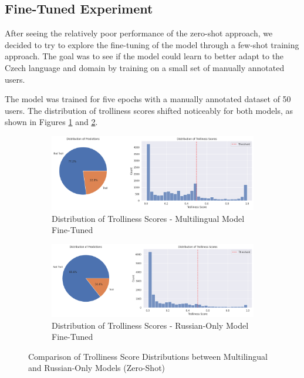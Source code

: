 \documentclass[twoside]{ctuthesis}
\theoremstyle{plain}
\theoremstyle{definition}
\theoremstyle{note}
\begin{document}
\subsection{Fine-Tuned Experiment}
After seeing the relatively poor performance of the zero-shot approach, we decided to try to explore the fine-tuning of the model through a few-shot training approach. The goal was to see if the model could learn to better adapt to the Czech language and domain by training on a small set of manually annotated users.\par
The model was trained for five epochs with a manually annotated dataset of 50 users. The distribution of trolliness scores shifted noticeably for both models, as shown in Figures \ref{fig:distribution_multi_finetuned} and \ref{fig:russian_distribution_finetuned}.\par

\begin{figure}[h]
  \centering
  \begin{subfigure}{0.49\textwidth}
    \includegraphics[width=\linewidth]{figures/distribution_fine_tuned.png}
    \caption{Distribution of Trolliness Scores - Multilingual Model Fine-Tuned}
    \label{fig:distribution_multi_finetuned}
  \end{subfigure}
  \hfill
  \begin{subfigure}{0.49\textwidth}
    \includegraphics[width=\linewidth]{figures/distribution_ru_finetuned0.png}
    \caption{Distribution of Trolliness Scores - Russian-Only Model Fine-Tuned}
    \label{fig:russian_distribution_finetuned}
  \end{subfigure}
  \caption{Comparison of Trolliness Score Distributions between Multilingual and Russian-Only Models (Zero-Shot)}
  \label{fig:distribution_comparison_finetuned}
\end{figure}
\end{document}
